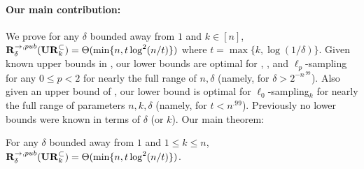 \paragraph{Our main contribution:} We prove for any $\delta$ bounded away from $1$ and $k\in[n]$, $\mathbf{R}^{\rightarrow,pub}_\delta(\mathbf{UR}_k^\subset) = \Theta(\min\{n, t\log^2(n/t)\})$ where $t = \max\{k,\log(1/\delta)\}$. Given known upper bounds in \cite{JowhariST11}, our lower bounds are optimal for , \suppfind{}, and $\ell_p$-sampling for any $0\le p<2$ for nearly the full range of $n, \delta$ (namely, for $\delta > 2^{-n^{.99}}$). Also given an upper bound of \cite{JowhariST11}, our lower bound is optimal for $\ell_0$-sampling$_k$ for nearly the full range of parameters $n, k, \delta$ (namely, for $t < n^{.99}$). Previously no lower bounds were known in terms of $\delta$ (or $k$). Our main theorem:


\begin{theorem}\label{thm:main}
For any $\delta$ bounded away from $1$ and $1\le k\le n$, $\mathbf{R}^{\rightarrow,pub}_\delta(\mathbf{UR}_k^\subset) = \Theta(\min\{n, t\log^2(n/t)\})$.
\end{theorem}



